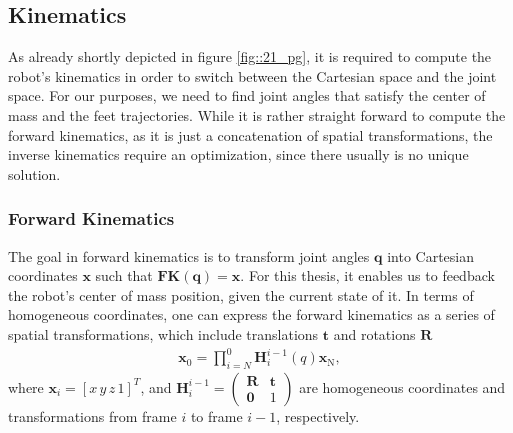 \FloatBarrier
\subsection{Kinematics}
\label{sec::214_k}
As already shortly depicted in figure \ref{fig::21_pg}, it is required to compute the robot's kinematics in order to switch between the Cartesian space and the joint space. For our purposes, we need to find joint angles that satisfy the center of mass and the feet trajectories. While it is rather straight forward to compute the forward kinematics, as it is just a concatenation of spatial transformations, the inverse kinematics require an optimization, since there usually is no unique solution.
\FloatBarrier
\subsubsection{Forward Kinematics}
\label{sec::2141_fk}
The goal in forward kinematics is to transform joint angles $\bm{q}$ into Cartesian coordinates $\bm{x}$ such that $\textbf{FK}(\bm{q}) = \bm{x}$. For this thesis, it enables us to feedback the robot's center of mass position, given the current state of it. In terms of homogeneous coordinates, one can express the forward kinematics as a series of spatial transformations, which include translations $\bm{t}$ and rotations $\bm{R}$ 
\begin{align}
	\bm{x}_\text{0} = \prod_{i=N}^{0}\bm{H}_i^{i-1}(q)\bm{x}_\text{N},
\end{align}
where $\bm{x}_i=[x\,y\,z\,1]^T$, and $\bm{H}_i^{i-1}=\begin{pmatrix}\bm{R} & \bm{t} \\ \bm{0} & 1 \end{pmatrix}$ are homogeneous coordinates and transformations from frame $i$ to frame $i-1$, respectively.
\FloatBarrier
